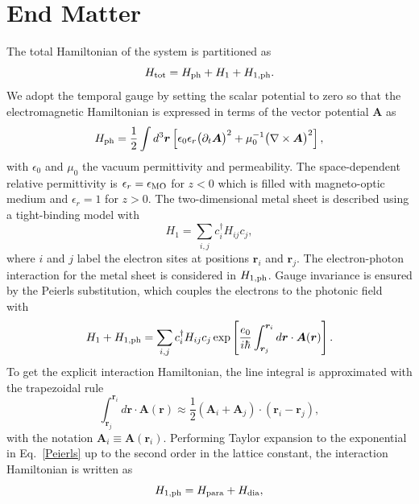 \documentclass[aps,prl,twocolumn,longbibliography]{revtex4-2}
\begin{document}
\section*{End Matter}
The total Hamiltonian of the system is partitioned as
\begin{equation}
  H_{\rm tot} = H_{\rm ph} + H_1 + H_{1, \rm ph} .
\end{equation}
We adopt the temporal gauge by setting the scalar potential to zero so that the
electromagnetic Hamiltonian is expressed in terms of the vector potential $\bm{A}$
as~\cite{QFT-Fradkin, Lifshitz_book, JSW23}
\begin{equation} \label{H_ph}
  H_{\rm ph} = \frac{1}{2} \int d^3\bm{r} \left[ \epsilon_0 \epsilon_r \big(
  \partial_t \bm{A} \big)^2 + \mu_0^{-1} \big( \nabla \times \bm{A} \big)^2 \right] ,
\end{equation}
with $\epsilon_0$ and $\mu_0$ the vacuum permittivity and permeability. The
space-dependent relative permittivity is $\epsilon_r = \epsilon_{\rm MO}$ for $z<0$
which is filled with magneto-optic medium and $\epsilon_r = 1$ for $z>0$.
The two-dimensional metal sheet is described using a tight-binding model with
\begin{equation}
  H_1 = \sum_{i, j} c_i^\dag H_{ij} c_j ,
\end{equation}
where $i$ and $j$ label the electron sites at positions $\bm{r}_i$ and $\bm{r}_j$.
The electron-photon interaction for the metal sheet is considered in $H_{1, \rm ph}$.
Gauge invariance is ensured by the Peierls substitution, which couples the electrons to
the photonic field with~\cite{JSW23}
\begin{equation} \label{Peierls}
  H_1 + H_{1, \rm ph} = \sum_{i, j} c_i^\dag  H_{ij} c_j
  \exp\left[ \frac{e_0}{i\hbar} \int_{\bm{r}_j}^{{\bm{r}_i}} d\bm{r} \cdot \bm{A}(\bm{r})
  \right] .
\end{equation}
To get the explicit interaction Hamiltonian, the line integral is approximated with the
trapezoidal rule
\begin{equation}
  \int_{\bm{r}_j}^{{\bm{r}_i}} d\bm{r} \cdot \bm{A}(\bm{r})
  \approx \frac{1}{2} (\bm{A}_i + \bm{A}_j) \cdot (\bm{r}_i - \bm{r}_j) ,
\end{equation}
with the notation $\bm{A}_i \equiv \bm{A}(\bm{r}_i)$.
Performing Taylor expansion to the exponential in Eq.~\eqref{Peierls} up to the second
order in the lattice constant, the interaction Hamiltonian is written as
\begin{equation} \label{H_int}
  H_{1,\rm ph} = H_{\rm para} + H_{\rm dia} ,
\end{equation}
\end{document}
